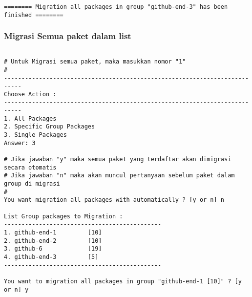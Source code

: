 {\begin{lstlisting}[language=ShellBash2]
======== Migration all packages in group "github-end-3" has been finished ========

\end{lstlisting}

\subsubsection{Migrasi Semua paket dalam list}

\begin{lstlisting}[language=ShellBash2]

# Untuk Migrasi semua paket, maka masukkan nomor "1"
#
---------------------------------------------------------------------------
Choose Action : 
---------------------------------------------------------------------------
1. All Packages
2. Specific Group Packages
3. Single Packages
Answer: 3

# Jika jawaban "y" maka semua paket yang terdaftar akan dimigrasi secara otomatis
# Jika jawaban "n" maka akan muncul pertanyaan sebelum paket dalam group di migrasi
# 
You want migration all packages with automatically ? [y or n] n

List Group packages to Migration : 
---------------------------------------------
1. github-end-1         [10]
2. github-end-2         [10]
3. github-6             [19]
4. github-end-3         [5]
---------------------------------------------

You want to migration all packages in group "github-end-1 [10]" ? [y or n] y



\end{lstlisting}}
